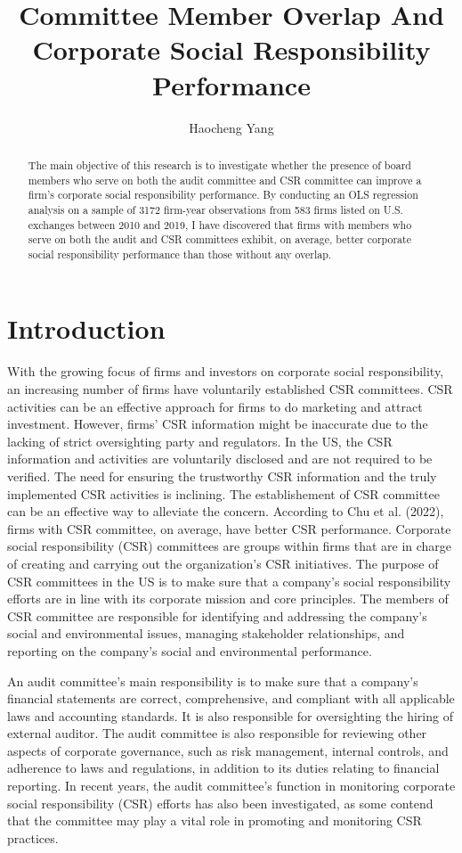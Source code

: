 \documentclass{article}
\title{Committee Member Overlap And Corporate Social Responsibility Performance}
\author{Haocheng Yang}
\begin{document}
\maketitle

\begin{abstract}
The main objective of this research is to investigate whether the presence of board members who serve on both the audit committee and CSR committee can improve a firm's corporate social responsibility performance. By conducting an OLS regression analysis on a sample of 3172 firm-year observations from 583 firms listed on U.S. exchanges between 2010 and 2019, I have discovered that firms with members who serve on both the audit and CSR committees exhibit, on average, better corporate social responsibility performance than those without any overlap.
\end{abstract}

\section{Introduction}

With the growing focus of firms and investors on corporate social responsibility, an increasing number of firms have voluntarily established CSR committees. CSR activities can be an effective approach for firms to do marketing and attract investment. However, firms’ CSR information might be inaccurate due to the lacking of strict oversighting party and regulators. In the US, the CSR information and activities are voluntarily disclosed and are not required to be verified. The need for ensuring the trustworthy CSR information and the truly implemented CSR activities is inclining. The establishement of CSR committee can be an effective way to alleviate the concern. According to Chu et al. (2022), firms with CSR committee, on average, have better CSR performance. Corporate social responsibility (CSR) committees are groups within firms that are in charge of creating and carrying out the organization's CSR initiatives. The purpose of CSR committees in the US is to make sure that a company's social responsibility efforts are in line with its corporate mission and core principles. The members of CSR committee are responsible for identifying and addressing the company's social and environmental issues, managing stakeholder relationships, and reporting on the company's social and environmental performance. 

An audit committee's main responsibility is to make sure that a company's financial statements are correct, comprehensive, and compliant with all applicable laws and accounting standards. It is also responsible for oversighting the hiring of external auditor. The audit committee is also responsible for reviewing other aspects of corporate governance, such as risk management, internal controls, and adherence to laws and regulations, in addition to its duties relating to financial reporting. In recent years, the audit committee's function in monitoring corporate social responsibility (CSR) efforts has also been investigated, as some contend that the committee may play a vital role in promoting and monitoring CSR practices.
\end{document}
